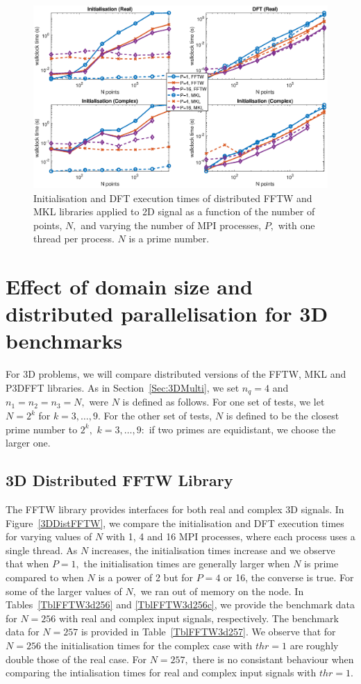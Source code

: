 \documentclass[a4paper]{article}
\begin{document}
\begin{figure}[htb]
    \centering
    \includegraphics[width=0.9\linewidth]{../results/fftw_mkl_prime_2d_mpi.eps}
  \caption{Initialisation and DFT execution times of distributed FFTW and MKL libraries applied to 2D signal as a function of the
    number of points, $N,$ and varying the number of MPI processes, $P,$ with one thread per process. $N$ is a prime number.}
  \label{2DDistFFTWMKLprime}
\end{figure}



\clearpage

\section{Effect of domain size and distributed parallelisation for 3D benchmarks}\label{Sec:3DDistr}
For 3D problems, we will compare distributed versions of the FFTW, MKL
and P3DFFT libraries. As in Section~\ref{Sec:3DMulti}, we set
$n_q=4$ and $n_1=n_2=n_3=N,$ were $N$ is defined as follows.  For one set
of tests, we let $N=2^k$ for $k=3,\ldots,9.$ For the other set of
tests, $N$ is defined to be the closest prime number to $2^k,$
$k=3,\ldots,9:$ if two primes are equidistant, we choose the larger
one.


\subsection{3D Distributed FFTW Library}\label{Sec:3DDistFFTW}
The FFTW library provides interfaces for both real and complex 3D
signals. In Figure~\ref{3DDistFFTW}, we compare the initialisation and
DFT execution times for varying values of $N$ with 1, 4 and 16 MPI
processes, where each process uses a single thread. As $N$ increases,
the initialisation times increase and we observe that when $P=1,$ the
initialisation times are generally larger when $N$ is prime compared
to when $N$ is a power of 2 but for $P=4$ or 16, the converse is
true. For some of the larger values of $N,$ we ran out of memory on
the node. In Tables~\ref{TblFFTW3d256} and \ref{TblFFTW3d256c}, we
provide the benchmark data for $N=256$ with real and complex input
signals, respectively. The benchmark data for $N=257$ is provided in
Table~\ref{TblFFTW3d257}. We observe that for $N=256$ the
initialisation times for the complex case with $thr=1$ are roughly
double those of the real case. For $N=257,$ there is no consistant
behaviour when comparing the intialisation times for real and complex
input signals with $thr=1.$
\end{document}
